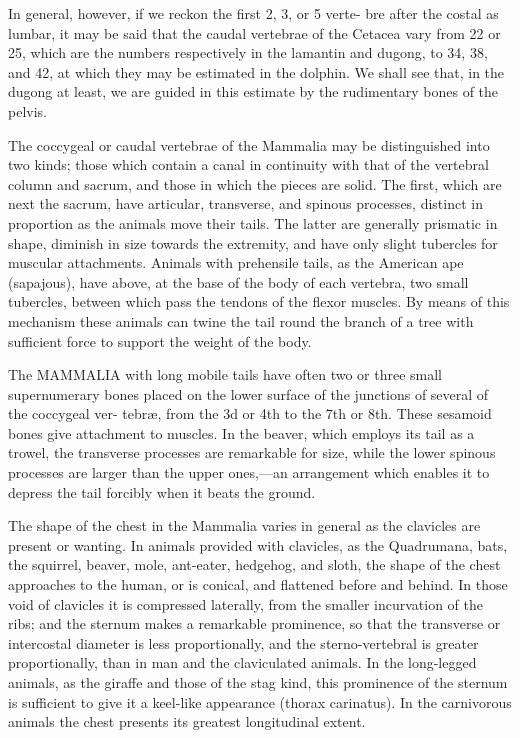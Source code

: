 \documentclass{article}
\begin{document}
In general, however, if we reckon the first 2, 3, or 5 verte-
bre after the costal as lumbar, it may be said that the
caudal vertebrae of the Cetacea vary from 22 or 25, which
are the numbers respectively in the lamantin and dugong,
to 34, 38, and 42, at which they may be estimated in the
dolphin. We shall see that, in the dugong at least, we are
guided in this estimate by the rudimentary bones of the
pelvis.

The coccygeal or caudal vertebrae of the Mammalia may be distinguished into two kinds; those which contain a canal in continuity with that of the vertebral column and sacrum, and those in which the pieces are solid. The first, which are next the sacrum, have articular, transverse, and spinous processes, distinct in proportion as the animals move their tails. The latter are generally prismatic in shape, diminish in size towards the extremity, and have only slight tubercles for muscular attachments. Animals with prehensile tails, as the American ape (sapajous), have above, at the base of the body of each vertebra, two small tubercles, between which pass the tendons of the flexor muscles. By means of this mechanism these animals can twine the tail round the branch of a tree with sufficient force to support the weight of the body.

The MAMMALIA with long mobile tails have often two
or three small supernumerary bones placed on the lower
surface of the junctions of several of the coccygeal ver-
tebræ, from the 3d or 4th to the 7th or 8th. These
sesamoid bones give attachment to muscles. In the
beaver, which employs its tail as a trowel, the transverse
processes are remarkable for size, while the lower spinous
processes are larger than the upper ones,—an arrangement
which enables it to depress the tail forcibly when it beats
the ground.

The shape of the chest in the Mammalia varies in general as the clavicles are present or wanting. In animals provided with clavicles, as the Quadrumana, bats, the squirrel, beaver, mole, ant-eater, hedgehog, and sloth, the shape of the chest approaches to the human, or is conical, and flattened before and behind. In those void of clavicles it is compressed laterally, from the smaller incurvation of the ribs; and the sternum makes a remarkable prominence, so that the transverse or intercostal diameter is less proportionally, and the sterno-vertebral is greater proportionally, than in man and the claviculated animals. In the long-legged animals, as the giraffe and those of the stag kind, this prominence of the sternum is sufficient to give it a keel-like appearance (thorax carinatus). In the carnivorous animals the chest presents its greatest longitudinal extent.
\end{document}
